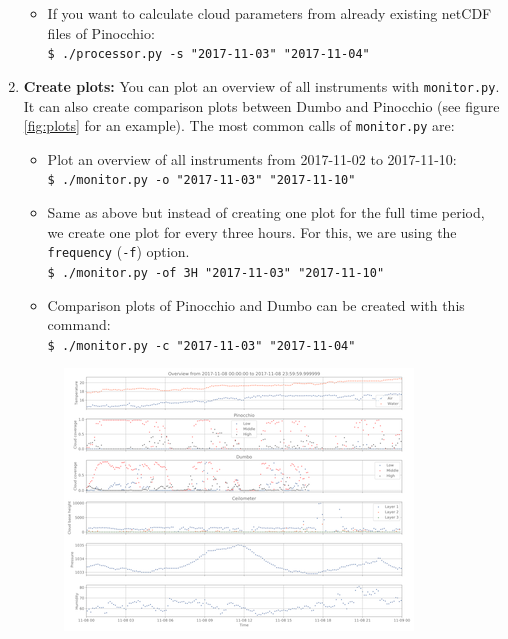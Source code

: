 \documentclass[11pt,a4paper]{article}
\begin{document}
\begin{enumerate}
\begin{itemize}
		\item If you want to calculate cloud parameters from already existing netCDF files of Pinocchio: \\
		\texttt{\$ ./processor.py -s "2017-11-03" "2017-11-04" }
	\end{itemize}
	\item \textbf{Create plots:}  You can plot an overview of all instruments with \texttt{monitor.py}. It can also create comparison plots between Dumbo and Pinocchio (see figure \ref{fig:plots} for an example). The most common calls of \texttt{monitor.py} are:
	\begin{itemize}
		\item Plot an overview of all instruments from 2017-11-02 to 2017-11-10:\\
		\texttt{\$ ./monitor.py -o "2017-11-03" "2017-11-10" }
		\item Same as above but instead of creating one plot for the full time period, we create one plot for every three hours. For this, we are using the \texttt{frequency} (\texttt{-f}) option.\\
		\texttt{\$ ./monitor.py -of 3H "2017-11-03" "2017-11-10"}
		\item Comparison plots of Pinocchio and Dumbo can be created with this command:\\
		\texttt{\$ ./monitor.py -c "2017-11-03" "2017-11-04" }
	\end{itemize}
	\begin{figure}
	\centering
	\begin{minipage}{.5\textwidth}
  		\centering
  		\includegraphics[width=\linewidth]{figures/overview.png}

\end{minipage}
\end{figure}
\end{enumerate}
\end{document}
